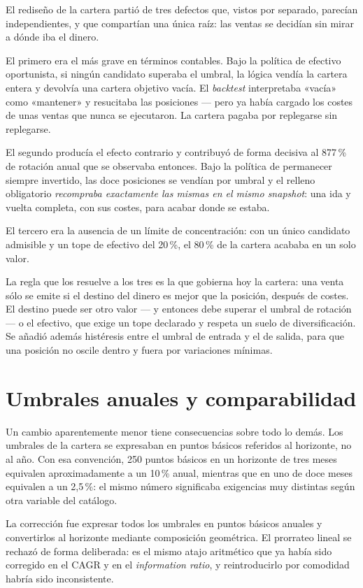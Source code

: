 El rediseño de la cartera partió de tres defectos que, vistos por separado, parecían independientes,
y que compartían una única raíz: las ventas se decidían sin mirar a dónde iba el dinero.

El primero era el más grave en términos contables. Bajo la política de efectivo oportunista, si
ningún candidato superaba el umbral, la lógica vendía la cartera entera y devolvía una cartera
objetivo vacía. El \textit{backtest} interpretaba «vacía» como «mantener» y resucitaba las
posiciones --- pero ya había cargado los costes de unas ventas que nunca se ejecutaron. La cartera
pagaba por replegarse sin replegarse.

El segundo producía el efecto contrario y contribuyó de forma decisiva al 877\,\% de rotación anual
que se observaba entonces. Bajo la política de permanecer siempre invertido, las doce posiciones se
vendían por umbral y el relleno obligatorio \emph{recompraba exactamente las mismas en el mismo
snapshot}: una ida y vuelta completa, con sus costes, para acabar donde se estaba.

El tercero era la ausencia de un límite de concentración: con un único candidato admisible y un tope
de efectivo del 20\,\%, el 80\,\% de la cartera acababa en un solo valor.

La regla que los resuelve a los tres es la que gobierna hoy la cartera: una venta sólo se emite si
el destino del dinero es mejor que la posición, después de costes. El destino puede ser otro valor
--- y entonces debe superar el umbral de rotación --- o el efectivo, que exige un tope declarado y
respeta un suelo de diversificación. Se añadió además histéresis entre el umbral de entrada y el de
salida, para que una posición no oscile dentro y fuera por variaciones mínimas.

\section{Umbrales anuales y comparabilidad}

Un cambio aparentemente menor tiene consecuencias sobre todo lo demás. Los umbrales de la cartera se
expresaban en puntos básicos referidos al horizonte, no al año. Con esa convención, 250 puntos
básicos en un horizonte de tres meses equivalen aproximadamente a un 10\,\% anual, mientras que en
uno de doce meses equivalen a un 2,5\,\%: el mismo número significaba exigencias muy distintas según
otra variable del catálogo.

La corrección fue expresar todos los umbrales en puntos básicos anuales y convertirlos al horizonte
mediante composición geométrica. El prorrateo lineal se rechazó de forma deliberada: es el mismo
atajo aritmético que ya había sido corregido en el CAGR y en el \textit{information ratio}, y
reintroducirlo por comodidad habría sido inconsistente.


